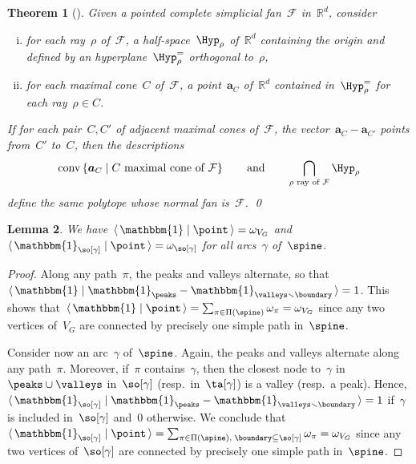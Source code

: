 \documentclass{amsart}
\newtheorem{theorem}{Theorem}[section]
\newtheorem{lemma}[theorem]{Lemma}
\theoremstyle{definition}
\newcommand{\R}{\mathbb{R}} %
\renewcommand{\c}[1]{{\mathcal{#1}}} %
\renewcommand{\b}[1]{{\boldsymbol{#1}}} %
\newcommand{\set}[2]{\left\{ #1 \;\middle|\; #2 \right\}} %
\newcommand{\ssm}{\smallsetminus} %
\newcommand{\dotprod}[2]{\langle \, #1 \; | \; #2 \, \rangle} %
\newcommand{\one}{\mathbbm{1}} %
\DeclareMathOperator{\conv}{conv} %
\newcommand{\weight}{\omega} %
\begin{document}
\begin{theorem}[]
  \label{thm:HohlwegLangeThomas}
  Given a pointed complete simplicial fan~$\c{F}$ in~$\R^d$, consider
  \begin{enumerate}[(i)]
    \item for each ray~$\rho$ of~$\c{F}$, a half-space~$\Hyp_\rho$ of~$\R^d$ containing the origin and defined by an hyperplane~$\Hyp^=_\rho$ orthogonal to~$\rho$,
    \item for each maximal cone~$C$ of~$\c{F}$, a point~$\b{a}_C$ of~$\R^d$ contained in~$\Hyp^=_\rho$ for each ray~$\rho \in C$.
  \end{enumerate}
  If for each pair~$C,C'$ of adjacent maximal cones of~$\c{F}$, the vector~$\b{a}_C - \b{a}_{C'}$ points from~$C'$ to~$C$, then the descriptions
  \[
    \conv\set{\b{a}_C}{C \text{ maximal cone of } \c{F}}
    \qquad\text{and}\qquad
    \bigcap_{\rho \text{ ray of } \c{F}} \Hyp_\rho
  \]
  define the same polytope whose normal fan is~$\c{F}$. \qed
\end{theorem}

\begin{lemma}
  \label{lem:vertexFacetIncidences}
  We have~$\dotprod{\one}{\point} = \weight_{V_G}$ and $\dotprod{\one_{\so[\gamma]}}{\point} = \weight_{\so[\gamma]}$ for all arcs~$\gamma$ of~$\spine$.
\end{lemma}

\begin{proof}
  Along any path~$\pi$, the peaks and valleys alternate, so that~$\dotprod{\one}{\one_{\peaks} - \one_{\valleys \ssm \boundary}} = 1$.
  This shows that~$\dotprod{\one}{\point} = \sum_{\pi \in \Pi(\spine)} \weight_\pi = \weight_{V_G}$ since any two vertices of~$V_G$ are connected by precisely one simple path in~$\spine$.
  
  Consider now an arc~$\gamma$ of~$\spine$.
  Again, the peaks and valleys alternate along any path~$\pi$.
  Moreover, if~$\pi$ contains~$\gamma$, then the closest node to~$\gamma$ in~$\peaks \cup \valleys$ in~$\so[\gamma]$ (resp.~in~$\ta[\gamma]$) is a valley (resp.~a peak).
  Hence, $\dotprod{\one_{\so[\gamma]}}{\one_{\peaks} - \one_{\valleys \ssm \boundary}} = 1$ if~$\gamma$ is included in~$\so[\gamma]$ and~$0$ otherwise.
  We conclude that~$\dotprod{\one_{\so[\gamma]}}{\point} = \sum_{\pi \in \Pi(\spine), \; \boundary \subseteq \so[\gamma]} \weight_\pi = \weight_{V_G}$ since any two vertices of~$\so[\gamma]$ are connected by precisely one simple path in~$\spine$.
\end{proof}
\end{document}
